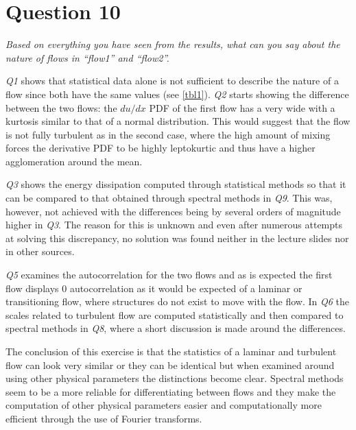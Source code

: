 \section*{Question 10}
\textit{Based on everything you have seen from the results, what can you say about the nature of flows in “flow1” and “flow2”.}

\textsl{Q1} shows that statistical data alone is not sufficient to describe the nature of a flow since both have the same values (see \ref{tbl1}). \textsl{Q2} starts showing the difference between the two flows: the $du/dx$ PDF of the first flow has a very wide with a kurtosis similar to that of a normal distribution. This would suggest that the flow is not fully turbulent as in the second case, where the high amount of mixing forces the derivative PDF to be highly leptokurtic and thus have a higher agglomeration around the mean.

\textsl{Q3} shows the energy dissipation computed through statistical methods so that it can be compared to that obtained through spectral methods in \textsl{Q9}. This was, however, not achieved with the differences being by several orders of magnitude higher in \textsl{Q3}. The reason for this is unknown and even after numerous attempts at solving this discrepancy, no solution was found neither in the lecture slides nor in other sources\cite{burchard01}\cite{george2009lectures}\cite{wilcox1998turbulence}.

\textsl{Q5} examines the autocorrelation for the two flows and as is expected the first flow displays $0$ autocorrelation as it would be expected of a laminar or transitioning flow, where structures do not exist to move with the flow. In \textsl{Q6} the scales related to turbulent flow are computed statistically and then compared to spectral methods in \textsl{Q8}, where a short discussion is made around the differences.

The conclusion of this exercise is that the statistics of a laminar and turbulent flow can look very similar or they can be identical but when examined around using other physical parameters the distinctions become clear. Spectral methods seem to be a more reliable for differentiating between flows and they make the computation of other physical parameters easier and computationally more efficient through the use of Fourier transforms.